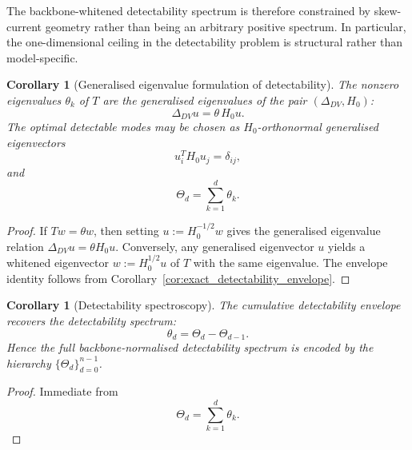 \documentclass[11pt,a4paper]{article}
\numberwithin{equation}{section}
\theoremstyle{thmcompact}
\newtheorem{corollary}[theorem]{Corollary}
\theoremstyle{remark}
\begin{document}
The backbone-whitened detectability spectrum is therefore constrained by skew-current geometry rather than being an arbitrary positive spectrum. In particular, the one-dimensional ceiling in the detectability problem is structural rather than model-specific.

\begin{corollary}[Generalised eigenvalue formulation of detectability]
\label{cor:generalised_eigenvalue_detectability}
The nonzero eigenvalues \(\theta_k\) of \(T\) are the generalised eigenvalues of the pair \((\Delta_{DV},H_0)\):
\begin{equation}
\Delta_{DV}u=\theta\,H_0u.
\end{equation}
The optimal detectable modes may be chosen as \(H_0\)-orthonormal generalised eigenvectors
\begin{equation}
u_i^T H_0 u_j=\delta_{ij},
\end{equation}
and
\begin{equation}
\Theta_d=\sum_{k=1}^{d}\theta_k.
\end{equation}
\end{corollary}

\begin{proof}
If \(Tw=\theta w\), then setting \(u:=H_0^{-1/2}w\) gives the generalised eigenvalue relation \(\Delta_{DV}u=\theta H_0u\). Conversely, any generalised eigenvector \(u\) yields a whitened eigenvector \(w:=H_0^{1/2}u\) of \(T\) with the same eigenvalue. The envelope identity follows from Corollary~\ref{cor:exact_detectability_envelope}.
\end{proof}

\begin{corollary}[Detectability spectroscopy]
\label{cor:detectability_spectroscopy}
The cumulative detectability envelope recovers the detectability spectrum:
\begin{equation}
\theta_d=\Theta_d-\Theta_{d-1}.
\end{equation}
Hence the full backbone-normalised detectability spectrum is encoded by the hierarchy \(\{\Theta_d\}_{d=0}^{n-1}\).
\end{corollary}

\begin{proof}
Immediate from
\begin{equation}
\Theta_d=\sum_{k=1}^{d}\theta_k.
\end{equation}
\end{proof}
\end{document}
